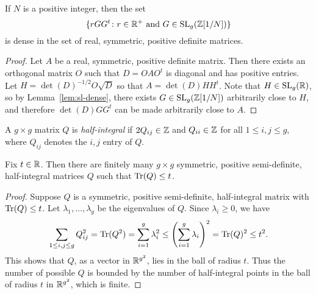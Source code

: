 \documentclass{amsart}
\begin{document}
\begin{lemma}\label{lem:rggt-dense}
  If $N$ is a positive integer, then the set
\[
\{ rGG^t \colon r \in \mathbb{R}^+ \text{ and } G \in \operatorname{SL}_g(\mathbb{Z}[1/N]) \}
\]
is dense in the set of real, symmetric, positive definite matrices.
\end{lemma}
\begin{proof}
  Let $A$ be a real, symmetric, positive definite matrix. Then there exists an orthogonal matrix $O$ such that $D = OAO^t$ is diagonal and has positive entries. Let $H = \det(D)^{-1/2}O\sqrt{D}$ so that $A = \det(D)HH^t$. Note that $H \in \operatorname{SL}_g(\mathbb{R})$, so by Lemma~\ref{lem:sl-dense}, there exists $G \in \operatorname{SL}_g(\mathbb{Z}[1/N])$ arbitrarily close to $H$, and therefore $\det(D)GG^t$ can be made arbitrarily close to $A$.
\end{proof}

\begin{definition}
  A $g \times g$ matrix $Q$ is \emph{half-integral} if $2Q_{ij} \in \mathbb{Z}$ and $Q_{ii} \in \mathbb{Z}$ for all $1 \leq i,j \leq g$, where $Q_{ij}$ denotes the $i,j$ entry of $Q$.
\end{definition}

\begin{lemma}\label{lem:finite-fixed-trace}
 Fix $t\in\mathbb{R}$. Then there are finitely many $g \times g$ symmetric, positive semi-definite, half-integral matrices $Q$ such that $\operatorname{Tr}(Q) \leq t$.
\end{lemma}
\begin{proof}
  Suppose $Q$ is a symmetric, positive semi-definite, half-integral matrix with $\operatorname{Tr}(Q) \leq t$. Let $\lambda_1,\dots,\lambda_g$ be the eigenvalues of $Q$. Since $\lambda_i \geq 0$, we have
  \[
    \sum_{1 \leq i,j \leq g} Q_{ij}^2 = \operatorname{Tr}(Q^2) = \sum_{i=1}^g \lambda_i^2 \leq \left(\sum_{i=1}^g \lambda_i\right)^2 = \operatorname{Tr}(Q)^2 \leq t^2.
  \]
  This shows that $Q$, as a vector in $\mathbb{R}^{g^2}$, lies in the ball of radius $t$. Thus the number of possible $Q$ is bounded by the number of half-integral points in the ball of radius $t$ in $\mathbb{R}^{g^2}$, which is finite.
\end{proof}
\end{document}
